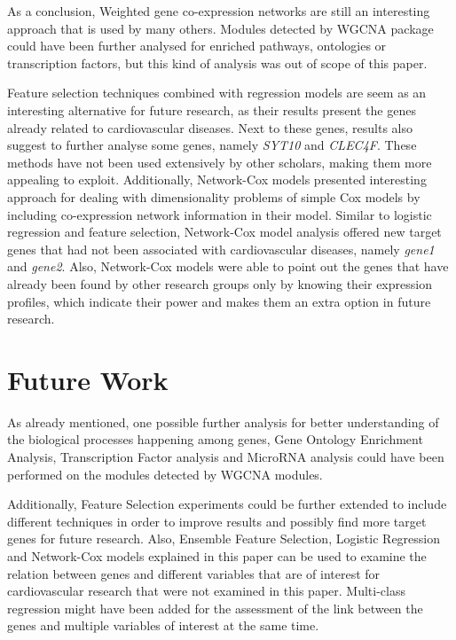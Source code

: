 \documentclass{ba-kecs}
\numberwithin{figure}{section}
\numberwithin{equation}{section}
\begin{document}
As a conclusion, Weighted gene co-expression networks are still an interesting approach that is used by many others. Modules detected by WGCNA package could have been further analysed for enriched pathways, ontologies or transcription factors, but this kind of analysis was out of scope of this paper.

Feature selection techniques combined with regression models are seem as an interesting alternative for future research, as their results present the genes already related to cardiovascular diseases. Next to these genes, results also suggest to further analyse some genes, namely \textit{SYT10} and \textit{CLEC4F}. These methods have not been used extensively by other scholars, making them more appealing to exploit. Additionally, Network-Cox models presented interesting approach for dealing with dimensionality problems of simple Cox models by including co-expression network information in their model. Similar to logistic regression and feature selection, Network-Cox model analysis offered new target genes that had not been associated with cardiovascular diseases, namely \textit{gene1} and \textit{gene2}. Also, Network-Cox models were able to point out the genes that have already been found by other research groups only by knowing their expression profiles, which indicate their power and makes them an extra option in future research.

\section{Future Work}

As already mentioned, one possible further analysis for better understanding of the biological processes happening among genes, Gene Ontology Enrichment Analysis, Transcription Factor analysis and MicroRNA analysis could have been performed on the modules detected by WGCNA modules.

Additionally, Feature Selection experiments could be further extended to include different techniques in order to improve results and possibly find more target genes for future research. Also, Ensemble Feature Selection, Logistic Regression and Network-Cox models explained in this paper can be used to examine the relation between genes and different variables that are of interest for cardiovascular research that were not examined in this paper. Multi-class regression might have been added for the assessment of the link between the genes and multiple variables of interest at the same time.
\end{document}
